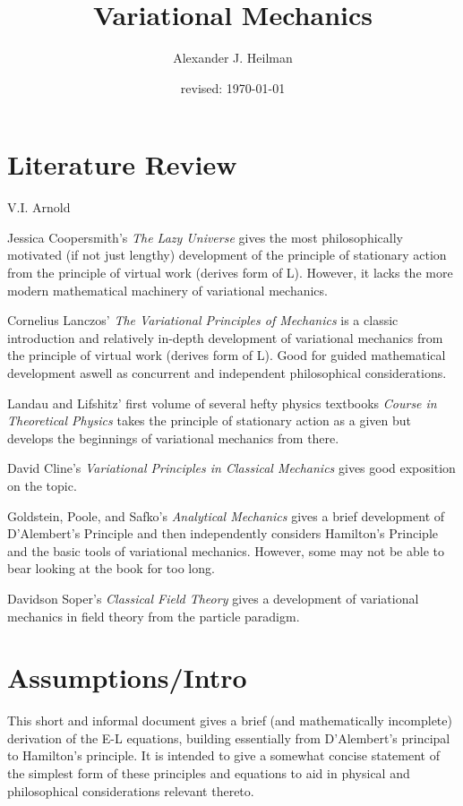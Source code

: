 \documentclass{article}\usepackage[]{graphicx}\usepackage[]{color}
\title{Variational Mechanics}%
\author{Alexander J. Heilman}%
\date{revised: \today}%
\begin{document}
\maketitle


\tableofcontents

\pagebreak

\section*{Literature Review}

V.I. Arnold


Jessica Coopersmith's \textit{The Lazy Universe} \cite{coopersmith} gives the most philosophically motivated (if not just lengthy) development of the principle of stationary action from the principle of virtual work (derives form of L). However, it lacks the more modern mathematical machinery of variational mechanics.

Cornelius Lanczos' \textit{The Variational Principles of Mechanics} \cite{lanczos} is a classic introduction and relatively in-depth development of variational mechanics from the principle of virtual work (derives form of L). Good for guided mathematical development aswell as concurrent and independent philosophical considerations.

Landau and Lifshitz' first volume of several hefty physics textbooks \textit{Course in Theoretical Physics} \cite{landau} takes the principle of stationary action as a given but develops the beginnings of variational mechanics from there.

David Cline's \textit{Variational Principles in Classical Mechanics} \cite{cline} gives good exposition on the topic.

Goldstein, Poole, and Safko's \textit{Analytical Mechanics} \cite{goldstein} gives a brief development of D'Alembert's Principle and then independently considers Hamilton's Principle and the basic tools of variational mechanics. However, some may not be able to bear looking at the book for too long.


Davidson Soper's \textit{Classical Field Theory} \cite{soper} gives a development of variational mechanics in field theory from the particle paradigm.

\section{Assumptions/Intro}

This short and informal document gives a brief (and mathematically incomplete) derivation of the E-L equations, building essentially from D'Alembert's principal to Hamilton's principle. It is intended to give a somewhat concise statement of the simplest form of these principles and equations to aid in physical and philosophical considerations relevant thereto.
\end{document}
